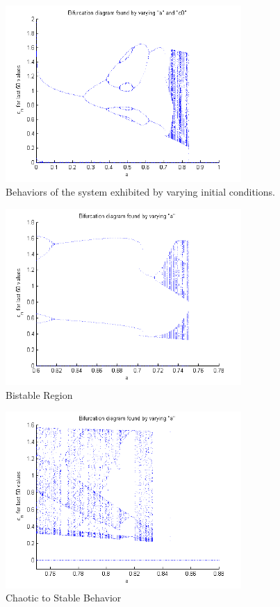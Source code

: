 \begin{figure}[H]
    \begin{center}
    \includegraphics[width=0.8\textwidth]{Varyac0}
    \end{center}
    \caption{Behaviors of the system exhibited by varying initial conditions.}
    \label{Fig. 3}
\end{figure}
\begin{figure}[H]
	\begin{center}
    \includegraphics[width=0.8\textwidth]{BistableRegion}
    \end{center}
    \caption{Bistable Region}
    \label{Fig. 4}
\end{figure}
\begin{figure}[H]
    \begin{center}
    \includegraphics[width=0.8\textwidth]{chaostoStable}
    \end{center}
    \caption{Chaotic to Stable Behavior}
    \label{Fig. 5}
\end{figure}
